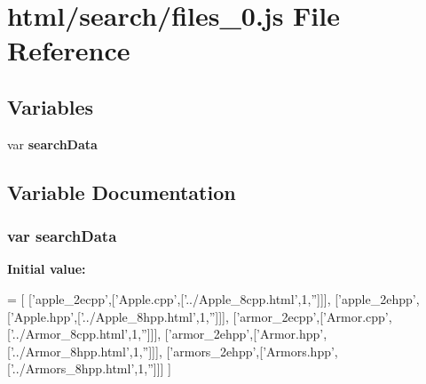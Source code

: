 \section{html/search/files\-\_\-0.js File Reference}
\label{files__0_8js}
\subsection*{Variables}
\begin{DoxyCompactItemize}
\item 
var {\bf search\-Data}
\end{DoxyCompactItemize}


\subsection{Variable Documentation}
\subsubsection[{search\-Data}]{\setlength{\rightskip}{0pt plus 5cm}var search\-Data}\label{files__0_8js_ad01a7523f103d6242ef9b0451861231e}
{\bfseries Initial value\-:}
\begin{DoxyCode}
=
[
  [\textcolor{stringliteral}{'apple\_2ecpp'},[\textcolor{stringliteral}{'Apple.cpp'},[\textcolor{stringliteral}{'../Apple\_8cpp.html'},1,\textcolor{stringliteral}{''}]]],
  [\textcolor{stringliteral}{'apple\_2ehpp'},[\textcolor{stringliteral}{'Apple.hpp'},[\textcolor{stringliteral}{'../Apple\_8hpp.html'},1,\textcolor{stringliteral}{''}]]],
  [\textcolor{stringliteral}{'armor\_2ecpp'},[\textcolor{stringliteral}{'Armor.cpp'},[\textcolor{stringliteral}{'../Armor\_8cpp.html'},1,\textcolor{stringliteral}{''}]]],
  [\textcolor{stringliteral}{'armor\_2ehpp'},[\textcolor{stringliteral}{'Armor.hpp'},[\textcolor{stringliteral}{'../Armor\_8hpp.html'},1,\textcolor{stringliteral}{''}]]],
  [\textcolor{stringliteral}{'armors\_2ehpp'},[\textcolor{stringliteral}{'Armors.hpp'},[\textcolor{stringliteral}{'../Armors\_8hpp.html'},1,\textcolor{stringliteral}{''}]]]
]
\end{DoxyCode}
